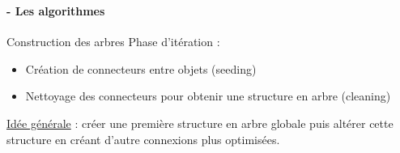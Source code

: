 \documentclass[8pt]{beamer}
\begin{document}
  
  \begin{frame}
  \frametitle{\secname}
  \framesubtitle{\subsecname - Les algorithmes}
    \begin{block}{Construction des arbres}
      Phase d’itération :
      \begin{itemize}
        \item Création de connecteurs entre objets (seeding)
        \item Nettoyage des connecteurs pour obtenir une structure en arbre (cleaning)
      \end{itemize}
      \underline{Idée générale} : créer une première structure en arbre globale puis altérer cette structure en créant d'autre connexions plus optimisées.
    \end{block}
  \end{frame}
  
\end{document}
